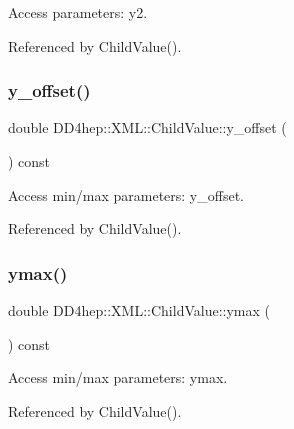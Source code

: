 Access parameters\+: y2. 



Referenced by Child\+Value().

\hypertarget{struct_d_d4hep_1_1_x_m_l_1_1_child_value_a6b235494c67254eec16ecac5d8bdbf70}{}\label{struct_d_d4hep_1_1_x_m_l_1_1_child_value_a6b235494c67254eec16ecac5d8bdbf70} 
\subsubsection{\texorpdfstring{y\+\_\+offset()}{y\_offset()}}
{\footnotesize\ttfamily double D\+D4hep\+::\+X\+M\+L\+::\+Child\+Value\+::y\+\_\+offset (\begin{DoxyParamCaption}{ }\end{DoxyParamCaption}) const}



Access min/max parameters\+: y\+\_\+offset. 



Referenced by Child\+Value().

\hypertarget{struct_d_d4hep_1_1_x_m_l_1_1_child_value_abfc209b8c7a38f5625b0e32710391bb6}{}\label{struct_d_d4hep_1_1_x_m_l_1_1_child_value_abfc209b8c7a38f5625b0e32710391bb6} 
\subsubsection{\texorpdfstring{ymax()}{ymax()}}
{\footnotesize\ttfamily double D\+D4hep\+::\+X\+M\+L\+::\+Child\+Value\+::ymax (\begin{DoxyParamCaption}{ }\end{DoxyParamCaption}) const}



Access min/max parameters\+: ymax. 



Referenced by Child\+Value().

\hypertarget{struct_d_d4hep_1_1_x_m_l_1_1_child_value_abd40926ea84fc05c74326a2642a0ae87}{}\label{struct_d_d4hep_1_1_x_m_l_1_1_child_value_abd40926ea84fc05c74326a2642a0ae87} 
